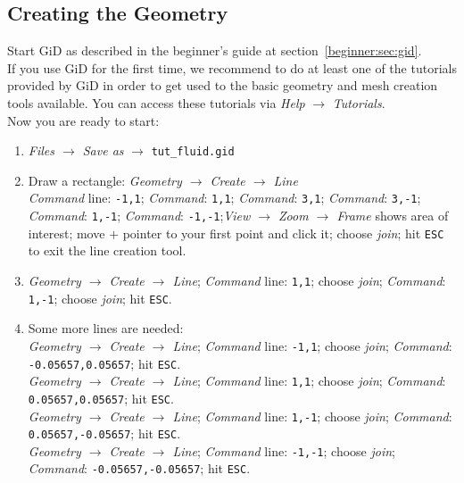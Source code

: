 \subsection{Creating the Geometry}
Start GiD as described in the beginner's guide at section~\ref{beginner:sec:gid}.\\
If you use GiD for the first time, we recommend to do at least one of the tutorials
provided by GiD in order to get used to the basic geometry and mesh creation
tools available. You can access these tutorials via \textit{Help} $\rightarrow$ \textit{Tutorials}.
\\
Now you are ready to start:
\begin{enumerate}
\item \emph{Files $\rightarrow$ Save as} $\rightarrow$ \texttt{tut\_fluid.gid}
\item Draw a rectangle: \emph{{Geometry} $\rightarrow$ Create $\rightarrow$ Line}\\
\emph{Command} line: \texttt{-1,1}; \emph{Command}: \texttt{1,1}; \emph{Command}: \texttt{3,1}; \emph{Command}: \texttt{3,-1};  \emph{Command}: \texttt{1,-1}; \emph{Command}: \texttt{-1,-1};\emph{View
$\rightarrow$ Zoom $\rightarrow$ Frame} shows area of interest;
move $+$ pointer to your first point and click it; choose \emph{join}; hit
\texttt{ESC} to exit the line creation tool.
\item \emph{{Geometry} $\rightarrow$ Create $\rightarrow$ Line};
\emph{Command} line: \texttt{1,1}; choose \emph{join}; \emph{Command}: \texttt{1,-1}; choose \emph{join}; hit \texttt{ESC}.
\item Some more lines are needed:\\
\emph{{Geometry} $\rightarrow$ Create $\rightarrow$ Line};
\emph{Command} line: \texttt{-1,1}; choose \emph{join}; \emph{Command}: \texttt{-0.05657,0.05657}; hit \texttt{ESC}.\\
\emph{{Geometry} $\rightarrow$ Create $\rightarrow$ Line};
\emph{Command} line: \texttt{1,1}; choose \emph{join}; \emph{Command}: \texttt{0.05657,0.05657}; hit \texttt{ESC}.\\
\emph{{Geometry} $\rightarrow$ Create $\rightarrow$ Line};
\emph{Command} line: \texttt{1,-1}; choose \emph{join}; \emph{Command}: \texttt{0.05657,-0.05657}; hit \texttt{ESC}.\\
\emph{{Geometry} $\rightarrow$ Create $\rightarrow$ Line};
\emph{Command} line: \texttt{-1,-1}; choose \emph{join}; \emph{Command}: \texttt{-0.05657,-0.05657}; hit \texttt{ESC}.


\end{enumerate}
